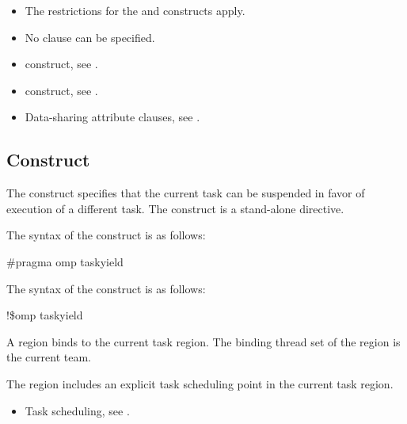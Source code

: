 \restrictions
\begin{itemize}
\item The restrictions for the  and  constructs apply.
\item No  clause can be specified. 
\end{itemize}

\crossreferences
\begin{itemize}
\item {} construct, see .
\item {} construct, see .
\item Data-sharing attribute clauses, see . 
\end{itemize}




%
%
\subsection{ Construct}
\label{subsec:taskyield Construct}
\summary
The  construct specifies that the current task can be suspended in favor of 
execution of a different task. The  construct is a stand-alone directive.

\syntax
\ccppspecificstart
The syntax of the  construct is as follows:

\begin{boxedcode}
\#pragma omp taskyield 
\end{boxedcode}
\ccppspecificend

\fortranspecificstart
The syntax of the  construct is as follows:

\begin{boxedcode}
!\$omp taskyield
\end{boxedcode}
\fortranspecificend

\binding
A  region binds to the current task region. The binding thread set of the 
 region is the current team.

\descr
The  region includes an explicit task scheduling point in the current task 
region.

\crossreferences
\begin{itemize}
\item Task scheduling, see 
. 
\end{itemize}













